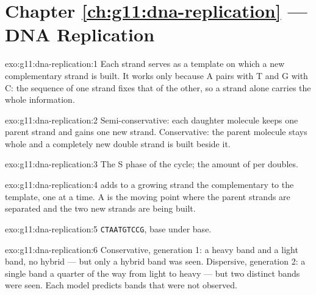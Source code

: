 \section*{Chapter \ref{ch:g11:dna-replication} --- DNA Replication}

\begin{solution}{exo:g11:dna-replication:1}
Each strand serves as a template on which a new complementary strand
is built. It works only because A pairs with T and G with C: the
sequence of one strand fixes that of the other, so a strand alone
carries the whole information.
\end{solution}

\begin{solution}{exo:g11:dna-replication:2}
Semi-conservative: each daughter molecule keeps one parent strand and
gains one new strand. Conservative: the parent molecule stays whole
and a completely new double strand is built beside it.
\end{solution}

\begin{solution}{exo:g11:dna-replication:3}
The S phase of the  cycle; the amount of  per  doubles.
\end{solution}

\begin{solution}{exo:g11:dna-replication:4}
 adds to a growing strand the  complementary
to the template, one at a time. A  is the moving point
where the parent strands are separated and the two new strands are
being built.
\end{solution}

\begin{solution}{exo:g11:dna-replication:5}
\texttt{CTAATGTCCG}, base under base.
\end{solution}

\begin{solution}{exo:g11:dna-replication:6}
Conservative, generation 1: a heavy band and a light band, no hybrid
--- but only a hybrid band was seen. Dispersive, generation 2: a
single band a quarter of the way from light to heavy --- but two
distinct bands were seen. Each model predicts bands that were not
observed.
\end{solution}

